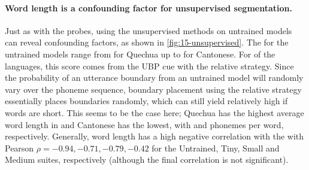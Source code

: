 


\paragraph{Word length is a confounding factor for unsupervised segmentation.}
Just as with the probes, using the unsupervised methods on untrained models can reveal confounding factors, as shown in \cref{fig:15-unsupervised}. The \fscores for the untrained models range from  for Quechua up to  for Cantonese. For  of the  languages, this score comes from the UBP cue with the relative strategy. Since the probability of an utterance boundary from an untrained model will randomly vary over the phoneme sequence, boundary placement using the relative strategy essentially places boundaries randomly, which can still yield relatively high \fscores if words are short. This seems to be the case here; Quechua has the highest average word length in \ipachildes and Cantonese has the lowest, with  and  phonemes per word, respectively. Generally, word length has a high negative correlation with the \fscores with Pearson $\rho = -0.94, -0.71, -0.79, -0.42$ for the Untrained, Tiny, Small and Medium suites, respectively (although the final correlation is not significant). 

